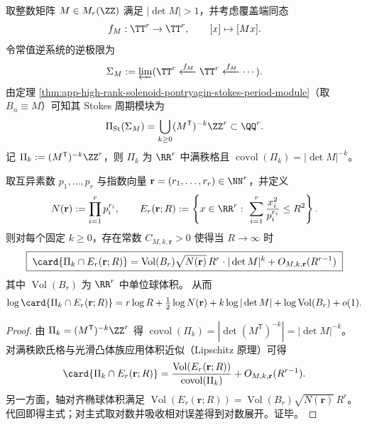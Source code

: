 \begin{proposition}\label{prop:app-solenoid-stokes-period-module-godel-ellipsoid-counting}
取整数矩阵 \(M\in M_r(\ZZ)\) 满足 \(|\det M|>1\)，并考虑覆盖端同态
\[
f_M:\TT^r\to\TT^r,\qquad [x]\mapsto[Mx].
\]
令常值逆系统的逆极限为
\[
\Sigma_M:=\varprojlim(\TT^r\xleftarrow{f_M}\TT^r\xleftarrow{f_M}\cdots).
\]
由定理 \ref{thm:app-high-rank-solenoid-pontryagin-stokes-period-module}（取 \(B_n\equiv M\)）可知其 Stokes 周期模块为
\[
\Pi_{\mathrm{St}}(\Sigma_M)=\bigcup_{k\ge 0}(M^{\mathsf T})^{-k}\ZZ^r\subset\QQ^r.
\]
记
\(
\Pi_k:=(M^{\mathsf T})^{-k}\ZZ^r
\)，则 \(\Pi_k\) 为 \(\RR^r\) 中满秩格且
\(
\operatorname{covol}(\Pi_k)=|\det M|^{-k}
\)。
\par
取互异素数 \(p_1,\dots,p_r\) 与指数向量 \(\mathbf r=(r_1,\dots,r_r)\in\NN^r\)，并定义
\[
N(\mathbf r):=\prod_{i=1}^{r}p_i^{r_i},
\qquad
E_r(\mathbf r;R):=\left\{x\in\RR^r:\ \sum_{i=1}^{r}\frac{x_i^2}{p_i^{r_i}}\le R^2\right\}.
\]
则对每个固定 \(k\ge 0\)，存在常数 \(C_{M,k,\mathbf r}>0\) 使得当 \(R\to\infty\) 时
\[
\boxed{\;
\card{\Pi_k\cap E_r(\mathbf r;R)}
=\operatorname{Vol}(B_r)\sqrt{N(\mathbf r)}\,R^r\cdot|\det M|^{k}
+O_{M,k,\mathbf r}(R^{r-1})\;}
\]
其中 \(\operatorname{Vol}(B_r)\) 为 \(\RR^r\) 中单位球体积。
从而
\[
\log\card{\Pi_k\cap E_r(\mathbf r;R)}
=r\log R+\tfrac12\log N(\mathbf r)+k\log|\det M|+\log\operatorname{Vol}(B_r)+o(1).
\]
\end{proposition}

\begin{proof}
由 \(\Pi_k=(M^{\mathsf T})^{-k}\ZZ^r\) 得
\(
\operatorname{covol}(\Pi_k)=|\det(M^{\mathsf T})^{-k}|=|\det M|^{-k}
\)。
对满秩欧氏格与光滑凸体族应用体积近似（Lipschitz 原理）可得
\[
\card{\Pi_k\cap E_r(\mathbf r;R)}
=\frac{\operatorname{Vol}(E_r(\mathbf r;R))}{\operatorname{covol}(\Pi_k)}+O_{M,k,\mathbf r}(R^{r-1}).
\]
另一方面，轴对齐椭球体积满足
\(
\operatorname{Vol}(E_r(\mathbf r;R))=\operatorname{Vol}(B_r)\sqrt{N(\mathbf r)}\,R^r
\)。
代回即得主式；对主式取对数并吸收相对误差得到对数展开。证毕。
\end{proof}

\endinput
